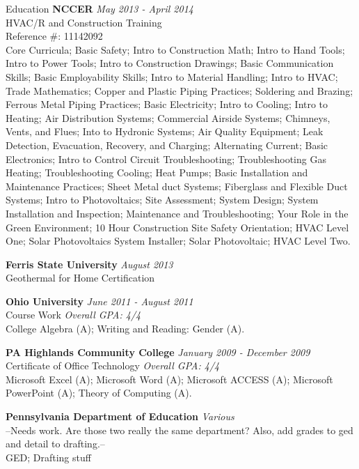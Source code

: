 \documentclass{resume} %
\begin{document}
\begin{rSection}{Education}
{\bf NCCER} {\em May 2013 - April 2014} 
\\ HVAC/R and Construction Training {}
\\ Reference \#: 11142092
\smallskip \\
Core Curricula; Basic Safety; Intro to Construction Math; Intro to Hand Tools; Intro to Power Tools; Intro to Construction Drawings; Basic Communication Skills; Basic Employability Skills; Intro to Material Handling; Intro to HVAC; Trade Mathematics; Copper and Plastic Piping Practices; Soldering and Brazing; Ferrous Metal Piping Practices; Basic Electricity; Intro to Cooling; Intro to Heating; Air Distribution Systems; Commercial Airside Systems; Chimneys, Vents, and Flues; Into to Hydronic Systems; Air Quality Equipment; Leak Detection, Evacuation, Recovery, and Charging; Alternating Current; Basic Electronics; Intro to Control Circuit Troubleshooting; Troubleshooting Gas Heating; Troubleshooting Cooling; Heat Pumps; Basic Installation and Maintenance Practices; Sheet Metal duct Systems; Fiberglass and Flexible Duct Systems; Intro to Photovoltaics; Site Assessment; System Design; System Installation and Inspection; Maintenance and Troubleshooting; Your Role in the Green Environment; 10 Hour Construction Site Safety Orientation; HVAC Level One; Solar Photovoltaics System Installer; Solar Photovoltaic; HVAC Level Two.


{\bf Ferris State University} {\em August 2013} 
\\ Geothermal for Home Certification {}


{\bf Ohio University}  {\em June 2011 - August 2011} 
\\ Course Work  {\em Overall GPA: 4/4}
\smallskip \\
College Algebra (A); Writing and Reading: Gender (A).

{\bf PA Highlands Community College} {\em January 2009 - December 2009} 
\\ Certificate of Office Technology {\em Overall GPA: 4/4}
\smallskip \\
Microsoft Excel (A); Microsoft Word (A); Microsoft ACCESS (A); Microsoft PowerPoint (A); Theory of Computing (A).

{\bf Pennsylvania Department of Education} {\em Various} 
\\ --Needs work. Are those two really the same department? Also, add grades to ged and detail to drafting.-- \hfill {}
\smallskip \\
GED; Drafting stuff

\end{rSection}
\end{document}
